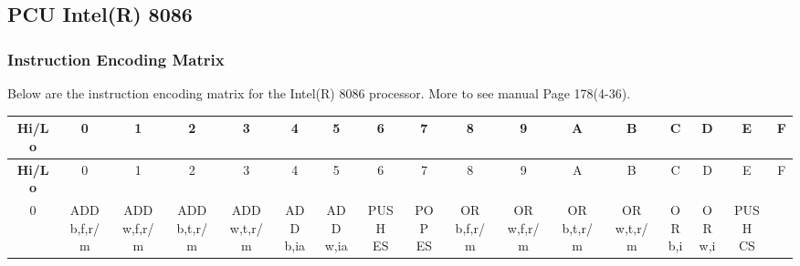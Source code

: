
\subsection{PCU Intel(R) 8086}


\subsubsection{Instruction Encoding Matrix}

Below are the instruction encoding matrix for the Intel(R) 8086 processor. More to see manual\cite{i8086} Page 178(4-36).

{ \setlength{\tabcolsep}{2pt} \fontsize{6pt}{6.18pt}\selectfont
\begin{longtable}{|c|c|c|c|c|c|c|c|c|c|c|c|c|c|c|c|c|}

	\hline
	\textbf{Hi/Lo} & 0 & 1 & 2 & 3 & 4 & 5 & 6 & 7 & 8 & 9 & A & B & C & D & E & F \\ \hline
	\endfirsthead
	\hline
	\textbf{Hi/Lo} & 0 & 1 & 2 & 3 & 4 & 5 & 6 & 7 & 8 & 9 & A & B & C & D & E & F \\ \hline
	\endhead
	\hline
	\endfoot
	\hline
	\endlastfoot

	0 &
	\makecell{ADD\\b,f,r/m} &
	\makecell{ADD\\w,f,r/m} &
	\makecell{ADD\\b,t,r/m} &
	\makecell{ADD\\w,t,r/m} &
	\makecell{ADD\\b,ia} &
	\makecell{ADD\\w,ia} &
	\makecell{PUSH\\ES} &
	\makecell{POP\\ES} &
	\makecell{OR\\b,f,r/m} &
	\makecell{OR\\w,f,r/m} &
	\makecell{OR\\b,t,r/m} &
	\makecell{OR\\w,t,r/m} &
	\makecell{OR\\b,i} &
	\makecell{OR\\w,i} &
	\makecell{PUSH\\CS} &
	\\ \hline


\end{longtable}}
